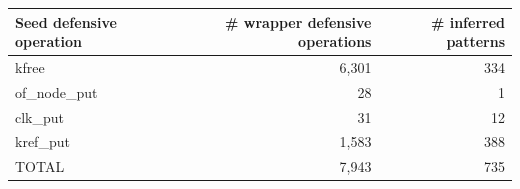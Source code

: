 \begin{tabular}{lrr}
\toprule
Seed defensive operation & \# wrapper defensive operations & \# inferred patterns \\
\midrule
kfree & 6,301 & 334 \\
of\_node\_put & 28 & 1 \\
clk\_put & 31 & 12 \\
kref\_put & 1,583 & 388 \\
TOTAL & 7,943 & 735 \\
\bottomrule
\end{tabular}
